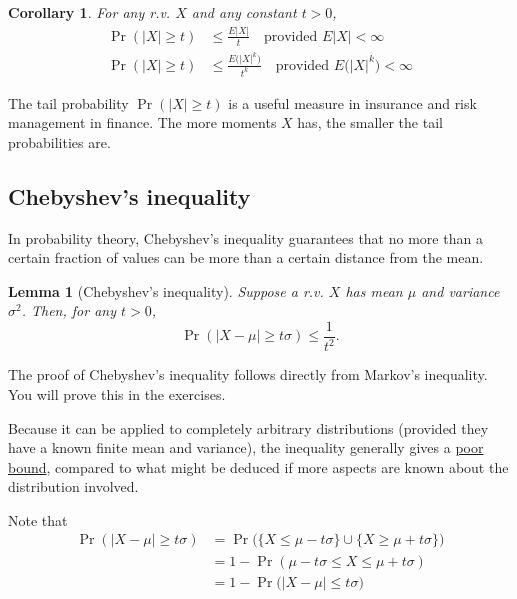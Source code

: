 \documentclass[
]{book}
\newtheorem{lemma}{Lemma}[chapter]
\newtheorem{corollary}{Corollary}[chapter]
\theoremstyle{definition}
\theoremstyle{definition}
\theoremstyle{definition}
\theoremstyle{definition}
\theoremstyle{remark}
\begin{document}
\begin{corollary}
For any r.v. \(X\) and any constant \(t>0\), \[\begin{aligned}
      \Pr(|X|\geq t) &\leq \frac{E|X|}{t} \ \ \ \text{ provided } E|X|<\infty \\
      \Pr(|X|\geq t) &\leq \frac{E\big(|X|^k\big)}{t^k} \ \ \ \text{ provided } E\big(|X|^k\big)<\infty
    \end{aligned}\]
\end{corollary}

The tail probability \(\Pr(|X|\geq t)\) is a useful measure in insurance and
risk management in finance. The more moments \(X\) has, the smaller the
tail probabilities are.

\hypertarget{chebyshevs-inequality}{%
\subsection{Chebyshev's inequality}\label{chebyshevs-inequality}}

In probability theory, Chebyshev's inequality guarantees that no more
than a certain fraction of values can be more than a certain distance
from the mean.

\begin{lemma}[Chebyshev's inequality]
Suppose a r.v. \(X\) has mean \(\mu\) and variance \(\sigma^2\). Then, for any
\(t>0\), \[\Pr(|X-\mu| \geq t\sigma) \leq \frac{1}{t^2}.\]
\end{lemma}

The proof of Chebyshev's inequality follows directly from Markov's inequality. You will prove this in the exercises.

Because it can be applied to completely arbitrary distributions (provided they have a known finite mean and variance), the inequality generally gives a \uline{poor bound}, compared to what might be deduced if more aspects are known about the distribution involved.

Note that
\begin{align*}
\Pr(|X-\mu| \geq t\sigma)
&= \Pr\big(\{ X \leq \mu - t\sigma \} \cup \{ X \geq \mu + t\sigma \}\big) \\
&= 1 - \Pr( \mu - t\sigma \leq X \leq \mu + t\sigma ) \\
&= 1 - \Pr\big(|X-\mu| \leq t\sigma\big)
\end{align*}
\end{document}

